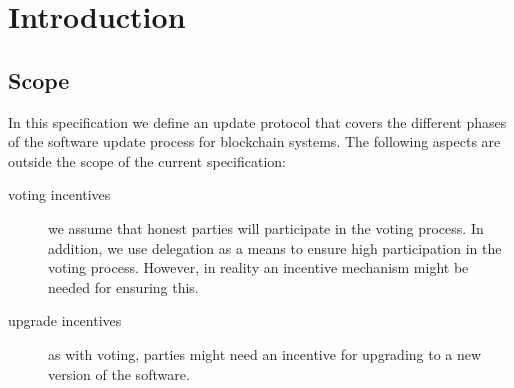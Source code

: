 \section{Introduction}
\label{sec:introduction}


\subsection{Scope}
\label{sec:scope}

In this specification we define an update protocol that covers the different
phases of the software update process for blockchain systems. The following
aspects are outside the scope of the current specification:

\begin{description}
\item[voting incentives] we assume that honest parties will participate in the
  voting process. In addition, we use delegation as a means to ensure high
  participation in the voting process. However, in reality an incentive
  mechanism might be needed for ensuring this.
\item[upgrade incentives] as with voting, parties might need an incentive for
  upgrading to a new version of the software.
\end{description}

